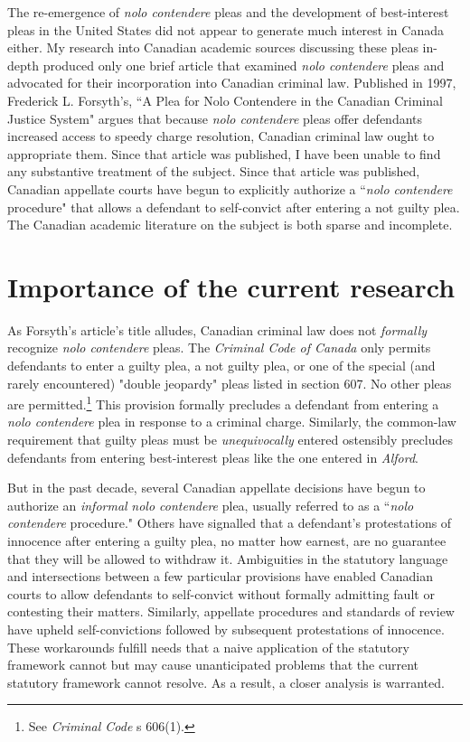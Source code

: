 The re-emergence of \textit{nolo contendere} pleas and the development of best-interest pleas in the United States did not appear to generate much interest in Canada either. My research into Canadian academic sources discussing these pleas in-depth produced only one brief article that examined \textit{nolo contendere} pleas and advocated for their incorporation into Canadian criminal law. Published in 1997, Frederick L. Forsyth's, ``A Plea for Nolo Contendere in the Canadian Criminal Justice System" argues that because \textit{nolo contendere} pleas offer defendants increased access to speedy charge resolution, Canadian criminal law ought to appropriate them. Since that article was published, I have been unable to find any substantive treatment of the subject. Since that article was published, Canadian appellate courts have begun to explicitly authorize a ``\textit{nolo contendere} procedure" that allows a defendant to self-convict after entering a not guilty plea. The Canadian academic literature on the subject is both sparse and incomplete.

\section{Importance of the current research}

As Forsyth's article's title alludes, Canadian criminal law does not \textit{formally} recognize \textit{nolo contendere} pleas. The \textit{Criminal Code of Canada} only permits defendants to enter a guilty plea, a not guilty plea, or one of the special (and rarely encountered) "double jeopardy" pleas listed in section 607. No other pleas are permitted.\footnote{See \textit{Criminal Code} s 606(1).} This provision formally precludes a defendant from entering a \textit{nolo contendere} plea in response to a criminal charge. Similarly, the common-law requirement that guilty pleas must be \textit{unequivocally} entered ostensibly precludes defendants from entering best-interest pleas like the one entered in \textit{Alford}.

But in the past decade, several Canadian appellate decisions have begun to authorize an \textit{informal} \textit{nolo contendere} plea, usually referred to as a ``\textit{nolo contendere} procedure." Others have signalled that a defendant's protestations of innocence after entering a guilty plea, no matter how earnest, are no guarantee that they will be allowed to withdraw it. Ambiguities in the statutory language and intersections between a few particular provisions have enabled Canadian courts to allow defendants to self-convict without formally admitting fault or contesting their matters. Similarly, appellate procedures and standards of review have upheld self-convictions followed by subsequent protestations of innocence. These workarounds fulfill needs that a naive application of the statutory framework cannot but may cause unanticipated problems that the current statutory framework cannot resolve. As a result, a closer analysis is warranted.

